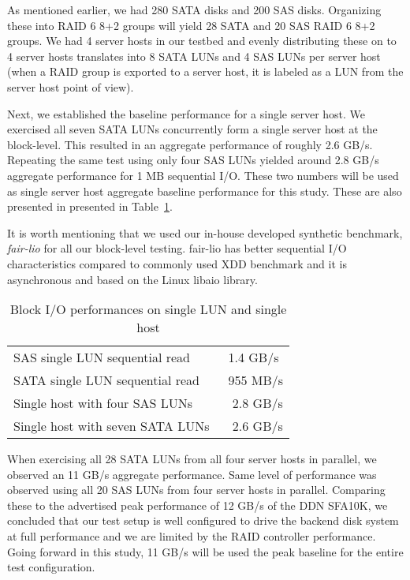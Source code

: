 As mentioned earlier, we had 280 SATA disks and 200 SAS disks. Organizing these
into RAID 6 8+2 groups will yield 28 SATA and 20 SAS RAID 6 8+2 groups. We had
4 server hosts in our testbed and evenly distributing these on to 4 server
hosts translates into 8 SATA LUNs and 4 SAS LUNs per server host (when a RAID
group is exported to a server host, it is labeled as a LUN from the server host
point of view).

Next, we established the baseline performance for a single server host. We
exercised all seven SATA LUNs concurrently form a single server host at the
block-level. This resulted in an aggregate performance of roughly 2.6 GB/s.
Repeating the same test using only four SAS LUNs yielded around 2.8 GB/s
aggregate performance for 1 MB sequential I/O. These two numbers will be used
as single server host aggregate baseline performance for this study. These are
also presented in presented in Table~\ref{tbl:block-io-baseline}. 

It is worth mentioning that we used our in-house developed synthetic benchmark,
\textit{fair-lio} for all our block-level testing.  fair-lio has better
sequential I/O characteristics compared to commonly used XDD benchmark and it
is asynchronous and based on the Linux libaio library.


\begin{table}[htb]
\centering
\caption{Block I/O performances on single LUN and single host}
\label{tbl:block-io-baseline}

\begin{tabular}{ l | l }
    \hline
    SAS single LUN sequential read & ~1.4 GB/s \\
    SATA single LUN sequential read & ~955 MB/s \\
    Single host with four SAS LUNs & ~ 2.8 GB/s \\
    Single host with seven SATA LUNs & ~ 2.6 GB/s \\
    \hline
\end{tabular}
\end{table}

When exercising all 28 SATA LUNs from all four server hosts in parallel, we
observed an 11 GB/s aggregate performance. Same level of performance was
observed using all 20 SAS LUNs from four server hosts in parallel. Comparing
these to the advertised peak performance of 12 GB/s of the DDN SFA10K, we
concluded that our test setup is well configured to drive the backend disk
system at full performance and we are limited by the RAID controller
performance. Going forward in this study, 11 GB/s will be used the peak
baseline for the entire test configuration.


